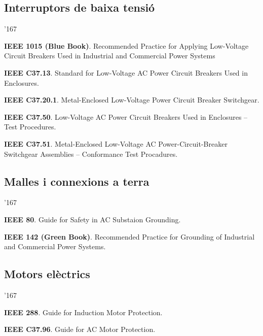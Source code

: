 \subsection*{Interruptors de baixa tensi\'{o}}
\begin{dinglist}{'167}
\item \textbf{IEEE 1015 (Blue Book)}. Recommended Practice for Applying Low-Voltage Circuit Breakers Used in Industrial and Commercial Power Systems 
     \item \textbf{IEEE C37.13}. Standard for Low-Voltage AC Power Circuit Breakers Used in Enclosures. 
    \item \textbf{IEEE C37.20.1}. Metal-Enclosed Low-Voltage Power Circuit Breaker Switchgear.
    \item \textbf{IEEE C37.50}. Low-Voltage AC Power Circuit Breakers Used in Enclosures -- Test Procedures.
    \item \textbf{IEEE C37.51}. Metal-Enclosed Low-Voltage AC Power-Circuit-Breaker Switchgear Assemblies -- Conformance Test Procadures.
\end{dinglist}


\subsection*{Malles i connexions a terra}
\begin{dinglist}{'167}
    \item \textbf{IEEE 80}. Guide for Safety in AC Substaion Grounding.
    \item \textbf{IEEE 142 (Green Book)}. Recommended Practice for Grounding of Industrial and Commercial Power Systems.
\end{dinglist}

\subsection*{Motors el\`{e}ctrics}
\begin{dinglist}{'167}
    \item \textbf{IEEE 288}. Guide for Induction Motor Protection.
    \item \textbf{IEEE C37.96}. Guide for AC Motor Protection.
\end{dinglist}


